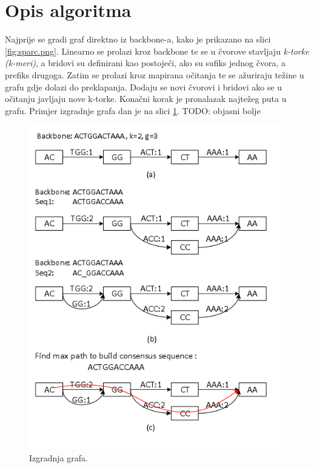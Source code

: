 \section{Opis algoritma}
Najprije se gradi graf direktno iz backbone-a, kako je prikazano na slici \ref{fig:sparc.png}.
Linearno se prolazi kroz backbone te se u čvorove stavljaju \emph{k-torke (k-meri)}, a bridovi su definirani kao postojeći, ako su sufiks jednog čvora, a prefiks drugoga. 
Zatim se prolazi kroz mapirana očitanja te se ažuriraju težine u grafu gdje dolazi do preklapanja.
Dodaju se novi čvorovi i bridovi ako se u očitanju javljaju nove k-torke.
Konačni korak je pronalazak najtežeg puta u grafu.
Primjer izgradnje grafa dan je na slici \ref{fig:sparc}.
TODO: objasni bolje

\begin{figure}[htb]
\centering
\includegraphics[scale=0.6]{figures/sparc.png}
\caption{Izgradnja grafa.}
\label{fig:sparc}
\end{figure}

